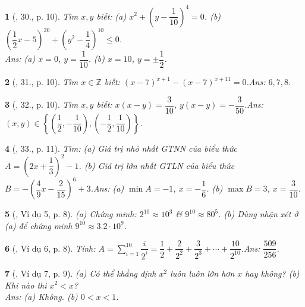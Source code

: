 \documentclass{article}
\newtheorem{baitoan}{}
\begin{document}
\begin{baitoan}[\cite{Tuyen_Toan_7}, 30., p. 10]
	Tìm $x,y$ biết: (a) $x^2 + \left(y - \dfrac{1}{10}\right)^4 = 0$. (b) $\left(\dfrac{1}{2}x - 5\right)^{20} + \left(y^2 - \dfrac{1}{4}\right)^{10}\le 0$.\\\mbox{}\hfill{\sf Ans: (a) $x = 0$, $y = \dfrac{1}{10}$. (b) $x = 10$, $y = \pm\dfrac{1}{2}$.}
\end{baitoan}

\begin{baitoan}[\cite{Tuyen_Toan_7}, 31., p. 10]
	Tìm $x\in\mathbb{Z}$ biết: $(x - 7)^{x + 1} - (x - 7)^{x + 11} = 0$.\hfill{\sf Ans: $6,7,8$.}
\end{baitoan}

\begin{baitoan}[\cite{Tuyen_Toan_7}, 32., p. 10]
	Tìm $x,y$ biết: $x(x - y) = \dfrac{3}{10}$, $y(x - y) = -\dfrac{3}{50}$.\hfill{\sf Ans: $(x,y)\in\left\{\left(\dfrac{1}{2},-\dfrac{1}{10}\right),\left(-\dfrac{1}{2},\dfrac{1}{10}\right)\right\}$.}
\end{baitoan}

\begin{baitoan}[\cite{Tuyen_Toan_7}, 33., p. 11]
	Tìm: (a) Giá trị nhỏ nhất {\rm GTNN} của biểu thức $A = \left(2x + \dfrac{1}{3}\right)^2 - 1$. (b) Giá trị lớn nhất {\rm GTLN} của biểu thức $B = -\left(\dfrac{4}{9}x - \dfrac{2}{15}\right)^6 + 3$.\hfill{\sf Ans: (a) $\min A = -1$, $x = -\dfrac{1}{6}$. (b) $\max B = 3$, $x = \dfrac{3}{10}$.}
\end{baitoan}

\begin{baitoan}[\cite{Binh_Toan_7_tap_1}, Ví dụ 5, p. 8]
	(a) Chứng minh: $2^{10}\approx 10^3$ \& $9^{10}\approx 80^5$. (b) Dùng nhận xét ở (a) để chứng minh $9^{10}\approx 3.2\cdot 10^9$.	
\end{baitoan}

\begin{baitoan}[\cite{Binh_Toan_7_tap_1}, Ví dụ 6, p. 8]
	Tính: $A = \sum_{i=1}^{10} \dfrac{i}{2^i} = \dfrac{1}{2} + \dfrac{2}{2^2} + \dfrac{3}{2^3} + \cdots + \dfrac{10}{2^{10}}$.\hfill{\sf Ans: $\dfrac{509}{256}$.}
\end{baitoan}

\begin{baitoan}[\cite{Binh_Toan_7_tap_1}, Ví dụ 7, p. 9]
	(a) Có thể khẳng định $x^2$ luôn luôn lớn hơn $x$ hay không? (b) Khi nào thì $x^2 < x$?\\\mbox{}\hfill{\sf Ans: (a) Không. (b) $0 < x < 1$.}
\end{baitoan}
\end{document}
